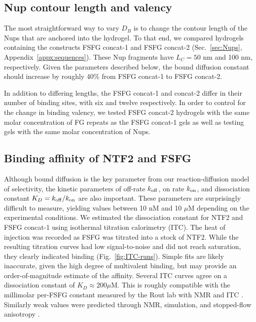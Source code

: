 \subsection{Nup contour length and valency}

The most straightforward way to vary $D_B$ is to change the contour length of the Nups that are anchored into the hydrogel.  To that end, we compared hydrogels containing the constructs FSFG concat-1 and FSFG concat-2 (Sec.~\ref{sec:Nups}, Appendix~\ref{appx:sequences}).  These Nup fragments have $L_C = 50$ nm and 100 nm, respectively.  Given the parameters described below, the bound diffusion constant should increase by roughly 40\% from FSFG concat-1 to FSFG concat-2.

In addition to differing lengths, the FSFG concat-1 and concat-2 differ in their number of binding sites, with six and twelve respectively.  In order to control for the change in binding valency, we tested FSFG concat-2 hydrogels with the same molar concentration of FG repeats as the FSFG concat-1 gels as well as testing gels with the same molar concentration of Nups.

\subsection{Binding affinity of NTF2 and FSFG}
Although bound diffusion is the key parameter from our reaction-diffusion model of selectivity, the kinetic parameters of off-rate $k_{\rm off}$, on rate $k_{\rm on}$, and dissociation constant $K_D = k_{\rm off}/k_{\rm on}$ are also important. These parameters are surprisingly difficult to measure, yielding values between 10 nM and 10 $\mu$M depending on the experimental conditions.  We estimated the dissociation constant for NTF2 and FSFG concat-1 using isothermal titration calorimetry (ITC).  The heat of injection was recorded as FSFG was titrated into a stock of NTF2.  While the resulting titration curves had low signal-to-noise and did not reach saturation, they clearly indicated binding (Fig.~\ref{fig:ITC-runs}).  Simple fits are likely inaccurate, given the high degree of multivalent binding, but may provide an order-of-magnitude estimate of the affinity.  Several ITC curves agree on a dissociation constant of $K_D \approx 200 \mu$M.  This is roughly compatible with the millimolar per-FSFG constant measured by the Rout lab with NMR and ITC \cite{hayama18}.  Similarly weak values were predicted through NMR, simulation, and stopped-flow anisotropy \cite{milles15}.

